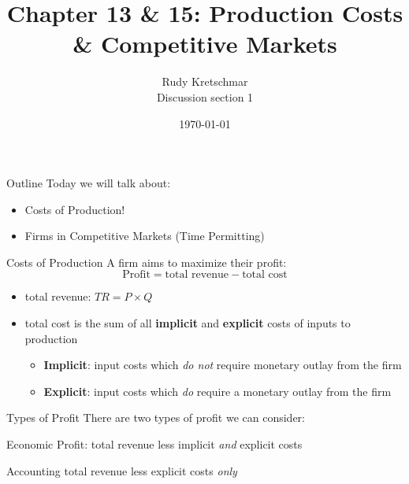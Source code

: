 \documentclass[compress]{beamer}
\title{Chapter 13 \& 15: Production Costs \& Competitive Markets}
\author{Rudy Kretschmar \\
    Discussion section 1}
\date{\today}
\begin{document}
\begin{frame}
    \titlepage 
\end{frame}

\begin{frame}{Outline}
    Today we will talk about:
    \begin{itemize}
        \item Costs of Production!
        \item Firms in Competitive Markets (Time Permitting)
    \end{itemize}
\end{frame}


\begin{frame}{Costs of Production}
    A firm aims to maximize their profit:
    \[\text{Profit} = \text{total revenue} - \text{total cost}\]
\begin{itemize}
    \item total revenue: \(TR = P \times Q\)
    \item total cost is the sum of all \textbf{implicit} and \textbf{explicit} costs of inputs to production
    \begin{itemize}
        \item \textbf{Implicit}: input costs which \textit{do not} require monetary outlay from the firm
        \item  \textbf{Explicit}: input costs which \textit{do} require a monetary outlay from the firm
    \end{itemize}
\end{itemize}
\end{frame}

\begin{frame}{Types of Profit}
    There are two types of profit we can consider:
    \begin{block}{Economic Profit:}
        total revenue less implicit \textit{and} explicit costs
    \end{block}

    \begin{block}{Accounting}
        total revenue less explicit costs \textit{only}
    \end{block}
\end{frame}
\end{document}
